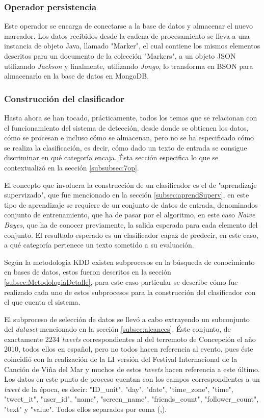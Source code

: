 \subsubsection*{Operador persistencia}
\label{subsubsec:8op}

Este operador se encarga de conectarse a la base de datos y almacenar el nuevo marcador. Los datos recibidos desde la cadena de procesamiento se lleva a una instancia de objeto Java, llamado "Marker", el cual contiene los mismos elementos descritos para un documento de la colección "Markers", a un objeto JSON utilizando \textit{Jackson} y finalmente, utilizando \textit{Jongo}, lo transforma en BSON para almacenarlo en la base de datos en MongoDB.

\subsubsection*{Construcción del clasificador}
\label{subsubsec:clasificacion}

Hasta ahora se han tocado, prácticamente, todos los temas que se relacionan con el funcionamiento del sistema de detección, desde donde se obtienen los datos, cómo se procesan e incluso cómo se almacenan, pero no se ha especificado cómo se realiza la clasificación, es decir, cómo dado un texto de entrada se consigue discriminar en qué categoría encaja. Ésta sección especifica lo que se contextualizó en la sección \ref{subsubsec:7op}.

El concepto que involucra la construcción de un clasificador es el de "aprendizaje supervizado", que fue mencionado en la sección \ref{subsec:aprendSuperv}, en este tipo de aprendizaje se requiere de un conjunto de datos de entrada, denominados conjunto de entrenamiento, que ha de pasar por el algoritmo, en este caso \textit{Naïve Bayes}, que ha de conocer previamente, la salida esperada para cada elemento del conjunto. El resultado esperado es un clasificador capaz de predecir, en este caso, a qué categoría pertenece un texto sometido a su evaluación.

Según la metodología KDD existen subprocesos en la búsqueda de conocimiento en bases de datos, estos fueron descritos en la sección \ref{subsec:MetodologiaDetalle}, para este caso particular se describe cómo fue realizado cada uno de estos subprocesos para la construcción del clasificador con el que cuenta el sistema.

El subproceso de selección de datos se llevó a cabo extrayendo un subconjunto del \textit{dataset} mencionado en la sección \ref{subsec:alcances}. Éste conjunto, de exactamente 2234 \textit{tweets} correspondientes al del terremoto de Concepción el año 2010, todos ellos en español, pero no todos hacen referencia al evento, pues éste coincidió con la realización de la LI versión del Festival Internacional de la Canción de Viña del Mar y muchos de estos \textit{tweets} hacen referencia a este último. Los datos en este punto de proceso cuentan con los campos correspondientes a un \textit{tweet} de la época, es decir: "ID\_unit", "day", "date", "time\_zone", "time", "tweet\_it", "user\_id", "name", "screen\_name", "friends\_count", "follower\_count", "text" y "value". Todos ellos separados por coma (,).

